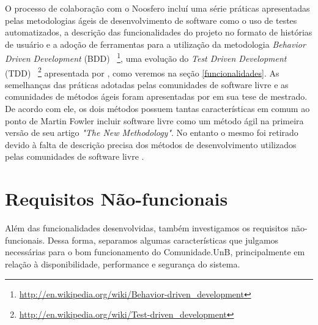 O processo de colaboração com o Noosfero incluí uma série práticas apresentadas
pelas metodologias ágeis de desenvolvimento de software como o uso de testes
automatizados, a descrição das funcionalidades do projeto no formato de
histórias de usuário e a adoção de ferramentas para a utilização da metodologia
\textit{Behavior Driven Development} (BDD)%
~\footnote{\url{http://en.wikipedia.org/wiki/Behavior-driven_development}},
uma evolução do \textit{Test Driven Development} (TDD)%
~\footnote{\url{http://en.wikipedia.org/wiki/Test-driven_development}}
apresentada por , como veremos na seção
\ref{funcionalidades}.
%
As semelhanças das práticas adotadas pelas comunidades de software livre e as
comunidades de métodos ágeis foram apresentadas por 
em sua tese de mestrado. De acordo com ele, os dois
métodos possuem tantas características em comum ao ponto de Martin Fowler
incluir software livre como um método ágil na primeira versão de seu artigo
\textit{"The New Methodology"}. No entanto o mesmo foi retirado devido
à falta de descrição precisa dos métodos de desenvolvimento utilizados pelas
comunidades de software livre .





\section{Requisitos Não-funcionais}

Além das funcionalidades desenvolvidas, também investigamos os requisitos
não-funcionais. Dessa forma, separamos algumas características que
julgamos necessárias para o bom funcionamento do Comunidade.UnB, principalmente
em relação à disponibilidade, performance e segurança do sistema.

